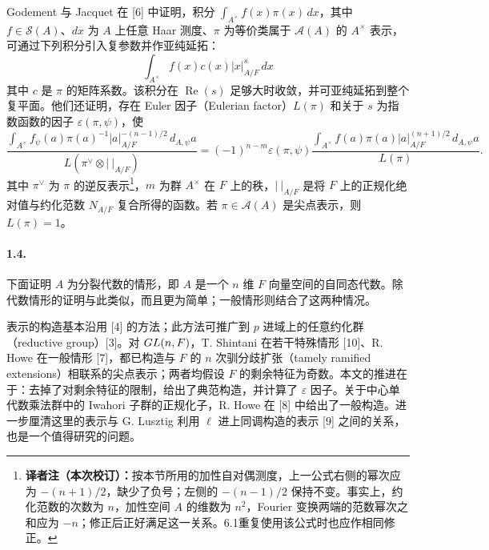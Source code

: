 Godement 与 Jacquet 在 [6] 中证明，积分 $\int_{A^\times}f(x)\pi(x)\,dx$，其中 $f\in\mathcal S(A)$、$dx$ 为 $A$ 上任意 Haar 测度、$\pi$ 为等价类属于 $\mathcal A(A)$ 的 $A^\times$ 表示，可通过下列积分引入复参数并作亚纯延拓：
\[
\int_{A^\times}f(x)c(x)|x|_{A/F}^s\,dx
\]
其中 $c$ 是 $\pi$ 的矩阵系数。该积分在 $\operatorname{Re}(s)$ 足够大时收敛，并可亚纯延拓到整个复平面。他们还证明，存在 Euler 因子（Eulerian factor）$L(\pi)$ 和关于 $s$ 为指数函数的因子 $\varepsilon(\pi,\psi)$，使
\[
\frac{\displaystyle\int_{A^\times}f_\psi(a)\pi(a)^{-1}|a|_{A/F}^{-(n-1)/2}\,d_{A,\psi}a}{L(\pi^\vee\otimes|\ |_{A/F})}
=(-1)^{n-m}\varepsilon(\pi,\psi)
\frac{\displaystyle\int_{A^\times}f(a)\pi(a)|a|_{A/F}^{(n+1)/2}\,d_{A,\psi}a}{L(\pi)}.
\]
其中 $\pi^\vee$ 为 $\pi$ 的逆反表示\footnote{\textbf{译者注（本次校订）：}按本节所用的加性自对偶测度，上一公式右侧的幂次应为 $-(n+1)/2$，缺少了负号；左侧的 $-(n-1)/2$ 保持不变。事实上，约化范数的次数为 $n$，加性空间 $A$ 的维数为 $n^2$，Fourier 变换两端的范数幂次之和应为 $-n$；修正后正好满足这一关系。6.1重复使用该公式时也应作相同修正。}，$m$ 为群 $A^\times$ 在 $F$ 上的秩，$|\ |_{A/F}$ 是将 $F$ 上的正规化绝对值与约化范数 $N_{A/F}$ 复合所得的函数。若 $\pi\in\mathcal A(A)$ 是尖点表示，则 $L(\pi)=1$。
\paragraph*{1.4.}下面证明 $A$ 为分裂代数的情形，即 $A$ 是一个 $n$ 维 $F$ 向量空间的自同态代数。除代数情形的证明与此类似，而且更为简单；一般情形则结合了这两种情况。

表示的构造基本沿用 [4] 的方法；此方法可推广到 $p$ 进域上的任意约化群（reductive group）[3]。对 $GL(n,F)$，T. Shintani 在若干特殊情形 [10]、R. Howe 在一般情形 [7]，都已构造与 $F$ 的 $n$ 次驯分歧扩张（tamely ramified extensions）相联系的尖点表示；两者均假设 $F$ 的剩余特征为奇数。本文的推进在于：去掉了对剩余特征的限制，给出了典范构造，并计算了 $\varepsilon$ 因子。关于中心单代数乘法群中的 Iwahori 子群的正规化子，R. Howe 在 [8] 中给出了一般构造。进一步厘清这里的表示与 G. Lusztig 利用 $\ell$ 进上同调构造的表示 [9] 之间的关系，也是一个值得研究的问题。

